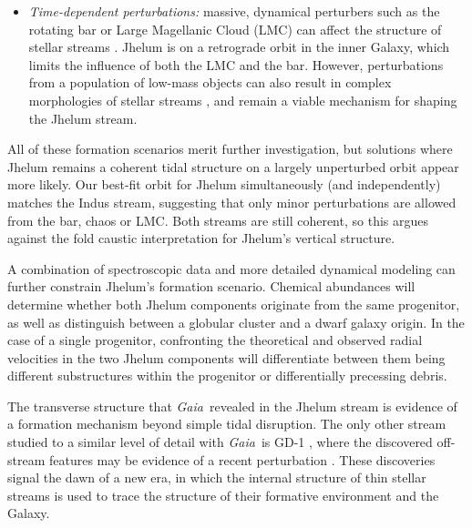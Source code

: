 \documentclass[twocolumn]{aastex62}
\newcommand{\gaia}{\textsl{Gaia}}
\newcommand{\apw}[1]{{\color{blue} APW: #1}}
\begin{document}
\begin{itemize}
{%
 }
 \item{\emph{Time-dependent perturbations:} massive, dynamical perturbers such as the rotating bar or Large Magellanic Cloud (LMC) can affect the structure of stellar streams \citep[e.g.,][]{pw2016b, pearson2017, erkal2019}.
 Jhelum is on a retrograde orbit in the inner Galaxy, which limits the influence of both the LMC and the bar.
 However, perturbations from a population of low-mass objects can also result in complex morphologies of stellar streams \citep[e.g.,][]{bonaca2014}, and remain a viable mechanism for shaping the Jhelum stream.
 }
\end{itemize}

All of these formation scenarios merit further investigation, but solutions where Jhelum remains a coherent tidal structure on a largely unperturbed orbit appear more likely.
Our best-fit orbit for Jhelum simultaneously (and independently) matches the Indus stream, suggesting that only minor perturbations are allowed from the bar, chaos or LMC.
Both streams are still coherent, so this argues against the fold caustic interpretation for Jhelum's vertical structure.

A combination of spectroscopic data and more detailed dynamical modeling can further constrain Jhelum's formation scenario.
Chemical abundances will determine whether both Jhelum components originate from the same progenitor, as well as distinguish between a globular cluster and a dwarf galaxy origin.
In the case of a single progenitor, confronting the theoretical and observed radial velocities in the two Jhelum components will differentiate between them being different substructures within the progenitor or differentially precessing debris.

The transverse structure that \gaia\ revealed in the Jhelum stream is evidence of a formation mechanism beyond simple tidal disruption.
The only other stream studied to a similar level of detail with \gaia\ is GD-1 \citep{pwb}, where the discovered off-stream features may be evidence of a recent perturbation \citep{bonaca2018}.
These discoveries signal the dawn of a new era, in which the internal structure of thin stellar streams is used to trace the structure of their formative environment and the Galaxy.
\end{document}
